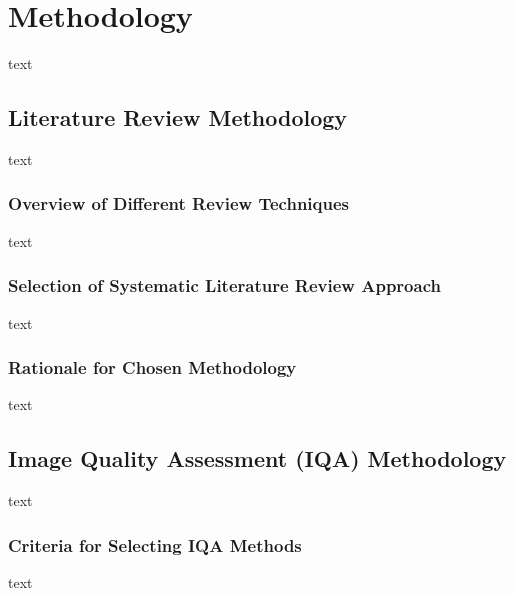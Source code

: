 \chapter{Methodology}
\label{ch:Methodology}
text

\section{Literature Review Methodology}
\label{sec:LiteratureReviewMethodology}
text \par
\vspace{\baselineskip}
\noindent

\subsection{Overview of Different Review Techniques}
\label{sub:OverviewReviewTechniques}
text \par
\vspace{\baselineskip}
\noindent

\subsection{Selection of Systematic Literature Review Approach}
\label{sub:SelectionSystematicLiteratureReview}
text \par
\vspace{\baselineskip}
\noindent

\subsection{Rationale for Chosen Methodology}
\label{sub:RationaleChosenMethodology}
text \par
\vspace{\baselineskip}
\noindent

\section{Image Quality Assessment (IQA) Methodology}
\label{sec:IQAMethodology}
text \par
\vspace{\baselineskip}
\noindent

\subsection{Criteria for Selecting IQA Methods}
\label{sub:CriteriaSelectingIQA}
text \par
\vspace{\baselineskip}
\noindent

